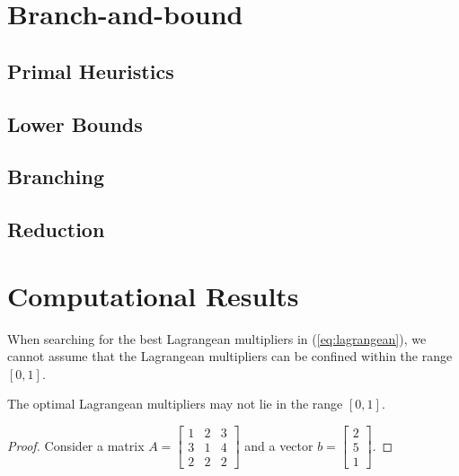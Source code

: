 \documentclass[runningheads]{llncs}
\begin{document}
\section{Branch-and-bound}

\subsection{Primal Heuristics}

\subsection{Lower Bounds}

\subsection{Branching}

\subsection{Reduction}

\section{Computational Results}





When searching for the best Lagrangean multipliers in (\ref{eq:lagrangean}), we cannot assume that the Lagrangean multipliers can be confined within the range $[0, 1]$.

\begin{lemma}
  The optimal Lagrangean multipliers may not lie in the range $[0, 1]$.
\end{lemma}

\begin{proof}
  Consider a matrix $A = \begin{bmatrix}
    1 & 2 & 3\\
    3 & 1 & 4\\
    2 & 2 & 2
    \end{bmatrix}$ and a vector $b = \begin{bmatrix}
      2\\
      5\\
      1
      \end{bmatrix}$.
\end{proof}
\end{document}
